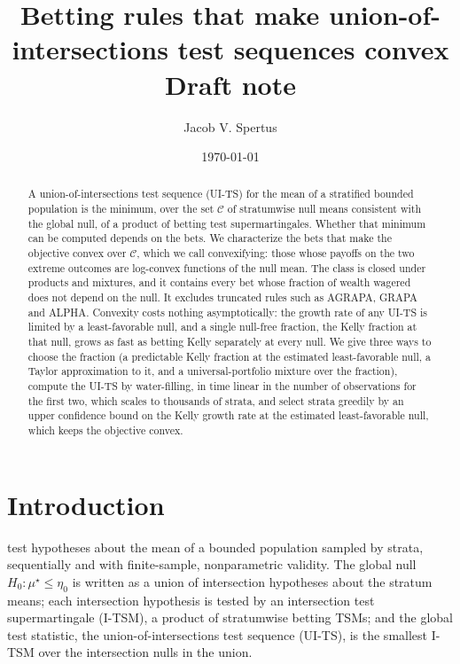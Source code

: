\documentclass[11pt]{article}
\title{Betting rules that make union-of-intersections test sequences convex\\[2pt]
       \large Draft note}
\author{Jacob V. Spertus}
\date{\today}
\newcommand{\calC}{\mathcal{C}}
\theoremstyle{plain}
\theoremstyle{definition}
\theoremstyle{remark}
\begin{document}
\maketitle

\begin{abstract}
A union-of-intersections test sequence (UI-TS) for the mean of a stratified bounded population is the minimum, over
the set $\calC$ of stratumwise null means consistent with the global null, of a product of betting test
supermartingales.  Whether that minimum can be computed depends on the bets.  We characterize the bets that make the
objective convex over $\calC$, which we call convexifying: those whose payoffs on the two extreme outcomes are
log-convex functions of the null mean.  The class is closed under products and mixtures, and it contains every bet
whose fraction of wealth wagered does not depend on the null.  It excludes truncated rules such as AGRAPA, GRAPA and
ALPHA.  Convexity costs nothing asymptotically: the growth rate of any UI-TS is limited by a least-favorable null, and
a single null-free fraction, the Kelly fraction at that null, grows as fast as betting Kelly separately at every
null.  We give three ways to choose the fraction (a predictable Kelly fraction at the estimated least-favorable null,
a Taylor approximation to it, and a universal-portfolio mixture over the fraction), compute the UI-TS by
water-filling, in time linear in the number of observations for the first two, which scales to thousands of strata,
and select strata
greedily by an upper confidence bound on the Kelly growth rate at the estimated least-favorable null, which keeps
the objective convex.
\end{abstract}

\section{Introduction}\label{sec:intro}

\citet{spertus2024sequential} test hypotheses about the mean of a bounded population sampled by
strata, sequentially and with finite-sample, nonparametric validity.  The global null $H_0 : \mu^\star \le \eta_0$
is written as a union of intersection hypotheses about the stratum means; each intersection hypothesis is
tested by an intersection test supermartingale (I-TSM), a product of stratumwise betting TSMs; and the global test
statistic, the union-of-intersections test sequence (UI-TS), is the smallest I-TSM over the intersection nulls in the
union.
\end{document}

